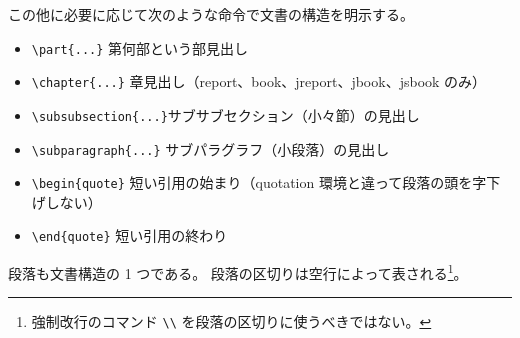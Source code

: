 この他に必要に応じて次のような命令で文書の構造を明示する。
\begin{itemize}\setlength{\leftskip}{-1.00zw}%
\item \verb'\part{...}'         第何部という部見出し
\item \verb'\chapter{...}'      章見出し（report、book、jreport、jbook、jsbook のみ）
\item \verb'\subsubsection{...}'サブサブセクション（小々節）の見出し
\item \verb'\subparagraph{...}' サブパラグラフ（小段落）の見出し
\item \verb'\begin{quote}'      短い引用の始まり（quotation 環境と違って段落の頭を字下げしない）
\item \verb'\end{quote}'        短い引用の終わり
\end{itemize}
段落も文書構造の 1 つである。
段落の区切りは空行によって表される\footnote{強制改行のコマンド \verb'\\' を段落の区切りに使うべきではない。}。
